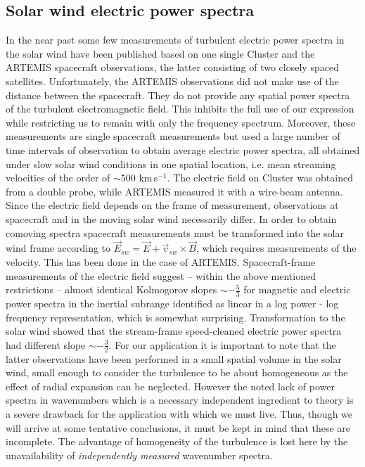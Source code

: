 \documentclass[ ]{copernicus2}
\begin{document}
{{{\subsection{Solar wind electric power spectra}
{In the near past some few measurements of turbulent electric power spectra in the solar wind have been published based on one single Cluster {\citep{bale2005,sahraoui2009}} and the {\small{ARTEMIS}} spacecraft \citep{chen2011} observations, the latter consisting of two closely spaced satellites. Unfortunately, the {\small{ARTEMIS}} observations did not make use of the distance between the spacecraft. They do not provide any spatial power spectra of the turbulent electromagnetic field. This inhibits the full use of our expression while restricting us to remain with only the frequency spectrum. Moreover, these measurements are single spacecraft measurements but used a large number of time intervals of observation to obtain average electric power spectra, all obtained under slow solar wind conditions in one spatial location, i.e. mean streaming velocities of the order of $\sim500$ km\,s$^{-1}$. The electric field on Cluster was obtained from a double probe, while {\small{ARTEMIS}} measured it  with a wire-beam antenna. Since the electric field depends on the frame of measurement, observations at spacecraft and in the moving solar wind necessarily differ. In order to obtain comoving spectra spacecraft measurements must be transformed into the solar wind frame according to $\vec{E}_{sw}=\vec{E}+\vec{v}_{sw}\times\vec{B}$, which requires measurements of the velocity. This has been done in the case of {\small{ARTEMIS}}. Spacecraft-frame measurements of the electric field suggest -- within the above mentioned restrictions -- almost identical Kolmogorov slopes $\sim-\frac{5}{3}$ for magnetic and electric power spectra \citep{bale2005,chen2011} in the inertial subrange identified as linear in a log power - log frequency representation, which is somewhat surprising. Transformation to the solar wind \citep{chen2011} showed that the stream-frame speed-cleaned electric power spectra had different slope $\sim -\frac{3}{2}$. {For our application it is important to note that the latter observations have been performed in a small spatial volume in the solar wind, small enough to consider the turbulence to be about homogeneous as the  effect of radial expansion can be neglected. However the noted lack of power spectra in wavenumbers which is a necessary independent ingredient to theory is a severe drawback for the application with which we must live. Thus, though we will arrive at some tentative conclusions, it must be kept in mind that these are incomplete. The advantage of homogeneity of the turbulence is lost here by the unavailability of \emph{independently measured} wavenumber spectra.}}

}}}
\end{document}
